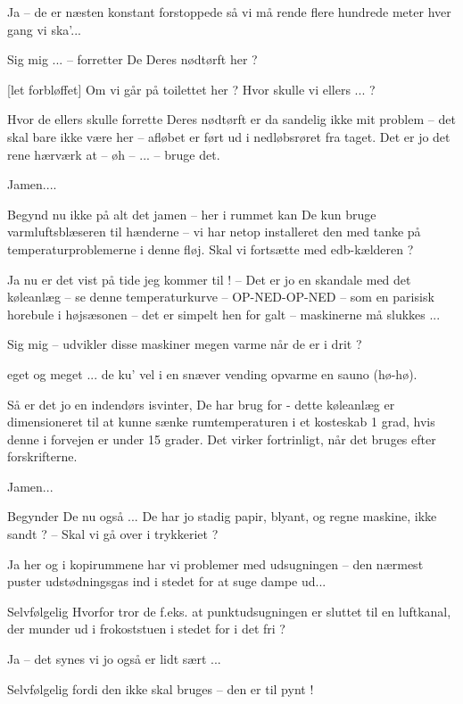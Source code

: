 \documentclass[a4paper,11pt]{article}
\begin{document}
\begin{sketch}
 Ja -- de er næsten konstant forstoppede så vi må rende flere hundrede
meter hver gang vi ska'...

 Sig mig ... -- forretter De Deres nødtørft her ?

[let forbløffet] Om vi går på toilettet her ? Hvor skulle vi ellers
... ?

 Hvor de ellers skulle forrette Deres nødtørft er da sandelig ikke mit
problem -- det skal bare ikke være her -- afløbet er ført ud i nedløbsrøret fra
taget. Det er jo det rene hærværk at -- øh -- ... -- bruge det.

 Jamen....

 Begynd nu ikke på alt det jamen -- her i rummet kan De kun bruge
varmluftsblæseren til hænderne -- vi har netop installeret den med tanke på
temperaturproblemerne i denne fløj. Skal vi fortsætte med edb-kælderen ?

 Ja nu er det vist på tide jeg kommer til ! -- Det er jo en skandale
med det køleanlæg -- se denne temperaturkurve -- OP-NED-OP-NED -- som en
parisisk horebule  i højsæsonen -- det er simpelt hen for galt -- maskinerne må
slukkes ...

 Sig mig -- udvikler disse maskiner megen varme når de er i drit ?

 eget og meget ... de ku' vel i en snæver vending opvarme en sauno
(hø-hø).

 Så er det jo en indendørs isvinter, De har brug for - dette køleanlæg
er dimensioneret til at kunne sænke rumtemperaturen i et kosteskab 1 grad, hvis
denne i forvejen er under 15 grader. Det virker fortrinligt, når det bruges
efter forskrifterne.

 Jamen...

 Begynder De nu også ... De har jo stadig papir, blyant, og regne
maskine, ikke sandt ? -- Skal vi gå over i trykkeriet ?

 Ja her og i kopirummene har vi problemer med udsugningen -- den
nærmest puster udstødningsgas ind i stedet for at suge dampe ud...

 Selvfølgelig Hvorfor tror de f.eks. at punktudsugningen er sluttet
til en luftkanal, der munder ud i frokoststuen i stedet for i det fri ?

 Ja -- det synes vi jo også er lidt sært ...

 Selvfølgelig fordi den ikke skal bruges -- den er til pynt !


\end{sketch}
\end{document}
